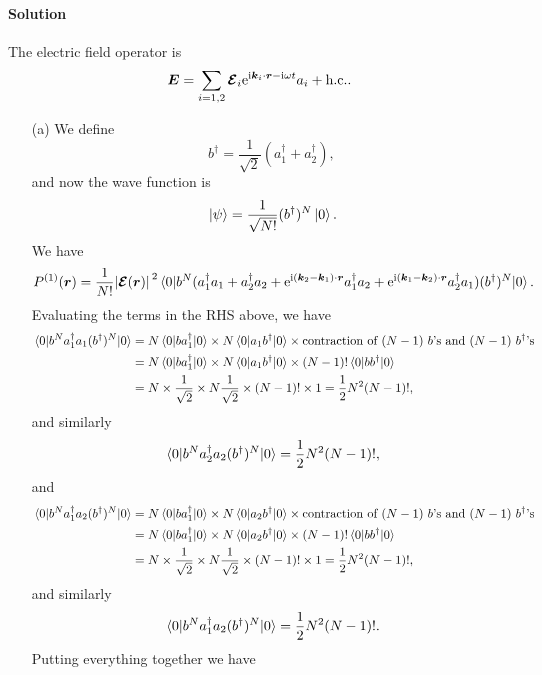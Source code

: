 \documentclass[hyperref, a4paper]{article}
\newcommand*{\ii}{\mathrm{i}}
\newcommand*{\ee}{\mathrm{e}}
\begin{document}
\paragraph{Solution} The electric field operator is 
\begin{equation}
    \vb*{E} = \sum_{i=1, 2} \vb*{\mathcal{E}}_i \ee^{\ii \vb*{k}_i \cdot \vb*{r} - \ii \omega t} a_i + \text{h.c.}. 
\end{equation}
\begin{itemize}
\item[(a)] We define 
\[
    b^\dagger = \frac{1}{\sqrt{2}} (a_1^\dagger + a_2^\dagger),
\] 
and now the wave function is 
\[
    \ket*{\psi} = \frac{1}{\sqrt{N!}} (b^\dagger)^N \ket*{0}.
\]
We have 
\[
    P^{(1)}(\vb*{r}) = \frac{1}{N!} \abs*{\vb*{\mathcal{E}} (\vb*{r})}^2 
    \expval*{b^N (a_1^\dagger a_1 + a_2^\dagger a_2 + \ee^{\ii (\vb*{k}_2 - \vb*{k}_1) \cdot \vb*{r}} a_1^\dagger a_2 + \ee^{\ii (\vb*{k}_1 - \vb*{k}_2) \cdot \vb*{r}} a_2^\dagger a_1 ) (b^\dagger)^N}{0} .
\]
Evaluating the terms in the RHS above, we have 
\[
    \begin{aligned}
        \expval*{b^N a_1^\dagger a_1 (b^\dagger)^N}{0} &= N \expval*{b a_1^\dagger}{0} \times N \expval*{a_1 b^\dagger}{0} 
        \times \text{contraction of $(N-1)$ $b$'s and $(N-1)$ $b^\dagger$'s} \\
        &= N \expval*{b a_1^\dagger}{0} \times N \expval*{a_1 b^\dagger}{0} \times (N-1)! \expval*{b b^\dagger}{0} \\
        &= N \times \frac{1}{\sqrt{2}} \times N \frac{1}{\sqrt{2}} \times (N-1)! \times 1 = \frac{1}{2} N^2 (N-1)!,
    \end{aligned}
\]
and similarly 
\[
    \expval*{b^N a_2^\dagger a_2 (b^\dagger)^N}{0} = \frac{1}{2} N^2 (N-1)!,
\]
and 
\[
    \begin{aligned}
        \expval*{b^N a_1^\dagger a_2 (b^\dagger)^N}{0} &= N \expval*{b a_1^\dagger}{0} \times N \expval*{a_2 b^\dagger}{0} 
        \times \text{contraction of $(N-1)$ $b$'s and $(N-1)$ $b^\dagger$'s} \\
        &= N \expval*{b a_1^\dagger}{0} \times N \expval*{a_2 b^\dagger}{0} \times (N-1)! \expval*{b b^\dagger}{0} \\
        &= N \times \frac{1}{\sqrt{2}} \times N \frac{1}{\sqrt{2}} \times (N-1)! \times 1 = \frac{1}{2} N^2 (N-1)!,
    \end{aligned}
\]
and similarly 
\[
    \expval*{b^N a_1^\dagger a_2 (b^\dagger)^N}{0} = \frac{1}{2} N^2 (N-1)!.
\]
Putting everything together we have 
\[
    \begin{aligned}

\end{aligned}\]
\end{itemize}
\end{document}
